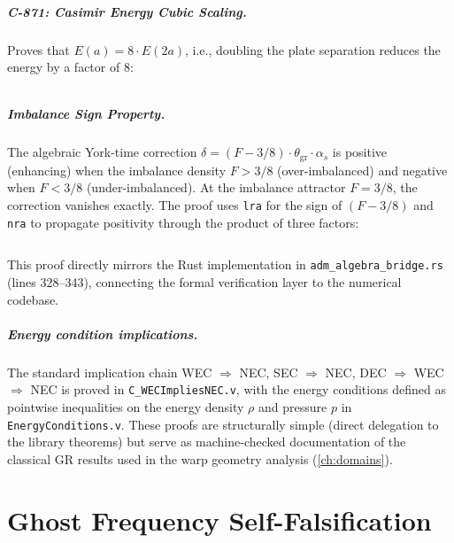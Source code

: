 \documentclass[12pt,openany]{report}
\theoremstyle{definition}
\theoremstyle{plain}
\theoremstyle{remark}
\begin{document}
\inputminted[firstline=31,lastline=49,fontsize=\scriptsize]{coq}{../../proofs/verified/C876_QuaternionRotation.v}

\paragraph{C-871: Casimir Energy Cubic Scaling.}
Proves that $E(a) = 8 \cdot E(2a)$, i.e., doubling the plate separation
reduces the energy by a factor of 8:

\inputminted[firstline=21,lastline=29,fontsize=\scriptsize]{coq}{../../proofs/verified/C871_CasimirExact.v}

\paragraph{Imbalance Sign Property.}
The algebraic York-time correction $\delta = (F - 3/8) \cdot
\theta_{\mathrm{gr}} \cdot \alpha_s$ is positive (enhancing) when the
imbalance density $F > 3/8$ (over-imbalanced) and negative when
$F < 3/8$ (under-imbalanced).  At the imbalance attractor $F = 3/8$, the
correction vanishes exactly.  The proof uses \texttt{lra} for the
sign of $(F - 3/8)$ and \texttt{nra} to propagate positivity through the
product of three factors:

\inputminted[firstline=23,lastline=33,fontsize=\scriptsize]{coq}{../../proofs/verified/C_OverImbalancedSign.v}

This proof directly mirrors the Rust implementation in
\texttt{adm\_algebra\_bridge.rs} (lines 328--343), connecting the
formal verification layer to the numerical codebase.

\paragraph{Energy condition implications.}
The standard implication chain WEC $\Rightarrow$ NEC, SEC $\Rightarrow$
NEC, DEC $\Rightarrow$ WEC $\Rightarrow$ NEC is proved in
\texttt{C\_WECImpliesNEC.v}, with the energy conditions defined as
pointwise inequalities on the energy density $\rho$ and pressure $p$ in
\texttt{EnergyConditions.v}.  These proofs are structurally simple
(direct delegation to the library theorems) but serve as machine-checked
documentation of the classical GR results used in the warp geometry
analysis (\cref{ch:domains}).


\chapter{Ghost Frequency Self-Falsification}
\label{ch:ghost}
\end{document}
